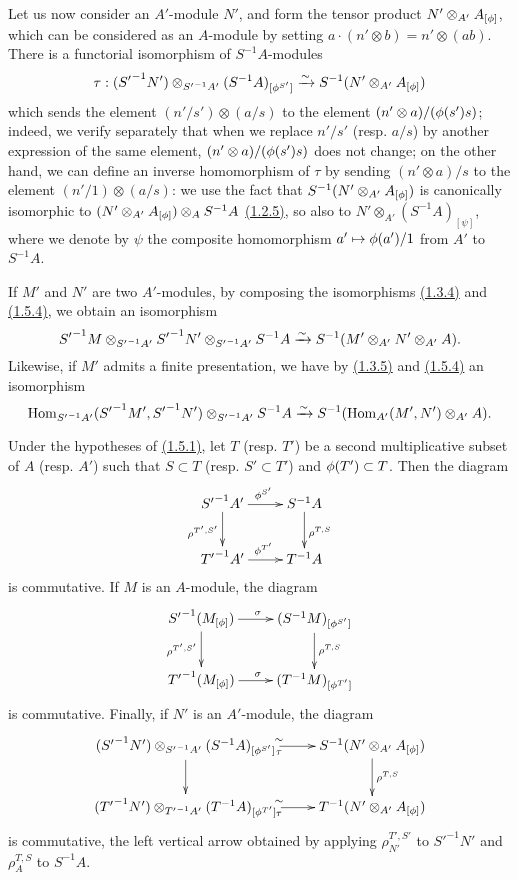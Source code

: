 \begin{env}[1.5.4]
\label{env-0.1.5.4}
Let us now consider an $A'$-module $N'$, and form the tensor product
$N'\otimes_{A'}A_{[\phi]}$, which can be considered as an $A$-module by setting
$a\cdot(n'\otimes b)=n'\otimes(ab)$. There is a functorial isomorphism of
$S^{-1}A$-modules
\[
  \tau:({S'}^{-1}N')\otimes_{{S'}^{-1}A'}(S^{-1}A)_{[\phi^{S'}]}
  \xrightarrow{\sim} S^{-1}(N'\otimes_{A'}A_{[\phi]})
\]
which sends the element $(n'/s')\otimes(a/s)$ to the element
$(n'\otimes a)/(\phi(s')s)$; indeed, we verify separately that when we replace
$n'/s'$ (resp. $a/s$) by another expression of the same element,
$(n'\otimes a)/(\phi(s')s)$ does not change; on the other hand, we can define
an inverse homomorphism of $\tau$ by sending $(n'\otimes a)/s$ to the element
$(n'/1)\otimes(a/s)$: we use the fact that $S^{-1}(N'\otimes_{A'}A_{[\phi]})$
is canonically isomorphic to $(N'\otimes_{A'}A_{[\phi]})\otimes_A S^{-1}A$
\hyperref[env-0.1.2.5]{(1.2.5)}, so also to $N'\otimes_{A'}(S^{-1}A)_{[\psi]}$, where we
denote by $\psi$ the composite homomorphism $a'\mapsto\phi(a')/1$ from $A'$ to
$S^{-1}A$.
\end{env}

\begin{env}[1.5.5]
\label{env-0.1.5.5}
If $M'$ and $N'$ are two $A'$-modules, by composing the isomorphisms
\hyperref[env-0.1.3.4]{(1.3.4)} and \hyperref[env-0.1.5.4]{(1.5.4)}, we obtain an isomorphism
\[
  {S'}^{-1}M\otimes_{{S'}^{-1}A'}{S'}^{-1}N'\otimes_{{S'}^{-1}A'}S^{-1}A
  \xrightarrow{\sim} S^{-1}(M'\otimes_{A'}N'\otimes_{A'}A).
\]
Likewise, if $M'$ admits a finite presentation, we have by \hyperref[env-0.1.3.5]{(1.3.5)} and
\hyperref[env-0.1.5.4]{(1.5.4)} an isomorphism
\[
  {\mathop{\mathrm{Hom}}\nolimits}_{{S'}^{-1}A'}({S'}^{-1}M',{S'}^{-1}N')\otimes_{{S'}^{-1}A'}S^{-1}A
  \xrightarrow{\sim} S^{-1}({\mathop{\mathrm{Hom}}\nolimits}_{A'}(M',N')\otimes_{A'}A).
\]
\end{env}

\begin{env}[1.5.6]
\label{env-0.1.5.6}
Under the hypotheses of \hyperref[env-0.1.5.1]{(1.5.1)}, let $T$ (resp. $T'$) be a second
multiplicative subset of $A$ (resp. $A'$) such that $S\subset T$
(resp. $S'\subset T'$) and $\phi(T')\subset T$. Then the diagram
\[
  \xymatrix{
    {S'}^{-1}A'\ar[r]^{\vphi^{S'}}\ar[d]_{\rho^{T',S'}} &
    S^{-1}A\ar[d]^{\rho^{T,S}}\\
    {T'}^{-1}A'\ar[r]^{\vphi^{T'}} &
    T^{-1}A
  }
\]
is commutative. If $M$ is an $A$-module, the diagram
\[
  \xymatrix{
    {S'}^{-1}(M_{[\vphi]})\ar[r]^\sigma\ar[d]_{\rho^{T',S'}} &
    (S^{-1}M)_{[\vphi^{S'}]}\ar[d]^{\rho^{T,S}}\\
    {T'}^{-1}(M_{[\vphi]})\ar[r]^\sigma &
    (T^{-1}M)_{[\vphi^{T'}]}
  }
\]
is commutative. Finally, if $N'$ is an $A'$-module, the diagram
\[
  \xymatrix{
    ({S'}^{-1}N')\otimes_{{S'}^{-1}A'}(S^{-1}A)_{[\vphi^{S'}]}
      \ar[r]^\sim_\tau\ar[d] &
    S^{-1}(N'\otimes_{A'}A_{[\vphi]})\ar[d]^{\rho^{T,S}}\\
    ({T'}^{-1}N')\otimes_{{T'}^{-1}A'}(T^{-1}A)_{[\vphi^{T'}]}
      \ar[r]^\sim_\tau &
    T^{-1}(N'\otimes_{A'}A_{[\vphi]})
  }
\]
is commutative, the left vertical arrow obtained by applying
$\rho_{N'}^{T',S'}$ to ${S'}^{-1}N'$ and $\rho_A^{T,S}$ to $S^{-1}A$.
\end{env}

